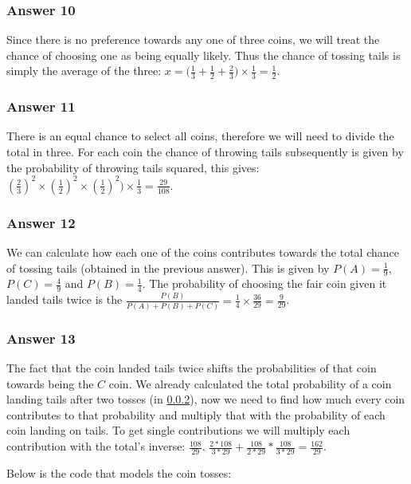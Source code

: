 \documentclass[11pt]{article}
\begin{document}
\subsubsection{Answer 10}
\label{sec-1-4-1}
Since there is no preference towards any one of three coins, we will treat
the chance of choosing one as being equally likely.  Thus the chance of
tossing tails is simply the average of the three:
$x = \Big(\frac{1}{3} + \frac{1}{2} + \frac{2}{3}\Big) \times \frac{1}{3} = \frac{1}{2}$.
\subsubsection{Answer 11}
\label{sec-1-4-2}
There is an equal chance to select all coins, therefore we will need to
divide the total in three.  For each coin the chance of throwing tails
subsequently is given by the probability of throwing tails squared, this
gives: $(\frac{2}{3})^2 \times (\frac{1}{2})^2 \times (\frac{1}{2})^2)
    \times \frac{1}{3} = \frac{29}{108}$.
\subsubsection{Answer 12}
\label{sec-1-4-3}
We can calculate how each one of the coins contributes towards the total
chance of tossing tails (obtained in the previous answer).  This is given by
$P(A) = \frac{1}{9}$, $P(C) = \frac{4}{9}$ and $P(B) = \frac{1}{4}$.  The
probability of choosing the fair coin given it landed tails twice is the
$\frac{P(B)}{P(A) + P(B) + P(C)} = \frac{1}{4} \times \frac{36}{29} = \frac{9}{29}$.
\subsubsection{Answer 13}
\label{sec-1-4-4}
The fact that the coin landed tails twice shifts the probabilities of that
coin towards being the $C$ coin.  We already calculated the total probability
of a coin landing tails after two tosses (in \ref{sec-1-4-2}), now we need to find
how much every coin contributes to that probability and multiply that with
the probability of each coin landing on tails.  To get single contributions
we will multiply each contribution with the total's inverse: $\frac{108}{29}$.
$\frac{2 * 108}{3 * 29} + \frac{108}{2 * 29} * \frac{108}{3 * 29} = \frac{162}{29}$.

Below is the code that models the coin tosses:
\end{document}
